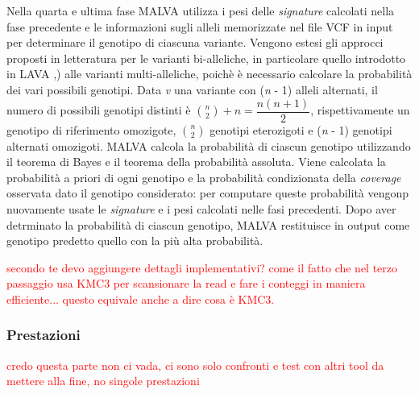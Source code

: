\documentclass[../main.tex]{subfiles}
\begin{document}
Nella quarta e ultima fase MALVA utilizza i pesi delle \textit{signature} calcolati nella fase precedente e le informazioni sugli alleli memorizzate nel file VCF in input per determinare il genotipo di ciascuna variante. Vengono estesi gli approcci proposti in letteratura per le varianti bi-alleliche, in particolare quello introdotto in LAVA \cite{shajii2016lava},) alle varianti multi-alleliche, poichè è necessario calcolare la probabilità dei vari possibili genotipi. Data \textit{v} una variante con (\textit{n} - 1) alleli alternati, il numero di possibili genotipi distinti è $\binom{n}{2} + n = \dfrac{n(n+1)}{2}$, rispettivamente un genotipo di riferimento omozigote, $\binom{n}{2}$ genotipi eterozigoti e (\textit{n} - 1) genotipi alternati omozigoti. MALVA calcola la probabilità di ciascun genotipo utilizzando il teorema di Bayes e il teorema della probabilità assoluta. Viene calcolata la probabilità a priori di ogni genotipo e la probabilità condizionata della \textit{coverage} osservata
dato il genotipo considerato: per computare queste probabilità vengonp nuovamente usate le \textit{signature} e i pesi calcolati nelle fasi precedenti. Dopo aver detrminato la probabilità di ciascun genotipo, MALVA restituisce in output come genotipo predetto quello con la più alta probabilità.



 \textcolor{red}{ secondo te devo aggiungere dettagli implementativi? come il fatto che nel terzo passaggio usa KMC3 per scansionare la read e fare i conteggi in maniera efficiente... questo equivale anche a dire cosa è KMC3.
 }



\subsubsection{Prestazioni}
 \textcolor{red} {credo questa parte non ci vada, ci sono solo confronti e test con altri tool da mettere alla fine, no singole prestazioni}
\end{document}
